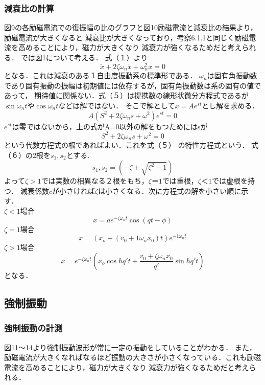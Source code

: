 \documentclass[a4paper,10.5pt]{jsarticle}
\begin{document}
\subsubsection{減衰比の計算}
図9の各励磁電流での復振幅の比のグラフと図10励磁電流と減衰比の結果より，励磁電流が大きくなると
減衰比が大きくなっており，考察6.1.1と同じく励磁電流を高めることにより，磁力が大きくなり
減衰力が強くなるためだと考えられる．
では図1について考える．
式（１）より
\begin{equation}
  \ddot{x}+2\zeta\omega_n\dot{x}+\omega_n^2x = 0
\end{equation}
となる．これは減衰のある１自由度振動系の標準形である．
$\omega_n$は固有角振動数であり固有振動の振幅は初期値には依存するが，固有角振動数は系の固有の値であって，
期待値に関係ない．式（５）は提携数の線形状微分方程式であるが$\sin\omega_{n}t$や$\cos\omega_{n}t$などは解ではない．
そこで解として$x=Ae^{st}$とし解を求める．
\begin{equation}
  A(S^2+2\zeta\omega_{n}s+\omega^2)e^{st} = 0
\end{equation}
$e^{st}$は零ではないから，上の式がA=0以外の解をもつためにはsが
\begin{equation}
  S^2+2\zeta\omega_{n}s+\omega^2= 0
\end{equation}
という代数方程式の根であればよい．これを式（５） の特性方程式という．
式（６）の2根を$s_1,s_2$とする.
\begin{equation}
  s_1,s_2= (-\zeta\pm\sqrt{\zeta^2-1})
\end{equation}
よって$\zeta>1$では実数の相異なる２根をもち，$\zeta＝1$では重根，$\zeta＜1$では虚根を持つ．
減衰係数$c$が小さければ$\zeta$は小さくなる．次に方程式の解を小さい順に示す．\\
$\zeta<1$場合
\begin{equation}
  x=ae^{-\zeta\omega_{n}t}\cos(qt-\phi)
\end{equation}
$\zeta=1$場合
\begin{equation}
  x=(x_o+(v_0+1\omega_nx_0)t)e^{-1\omega_nt}
\end{equation}
$\zeta>1$場合
\begin{equation}
  x=e^{-\zeta\omega_{n}t}(x_o\cos{h}q't+\dfrac{v_0+\zeta\omega_nx_0}{q'}\sin{hq't})
\end{equation}
となる．

\subsection{強制振動}
\subsubsection{強制振動の計測}
図11〜14より強制振動波形が常に一定の振動をしていることがわかる．
また，励磁電流が大きくなればなるほど振動の大きさが小さくなっている．これも励磁電流を高めることにより，磁力が大きくなり
減衰力が強くなるためだと考えられる．
\end{document}
